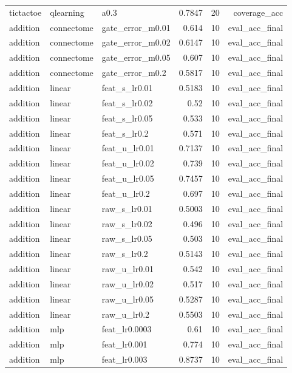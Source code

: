 \begin{table}[t]
\begin{tabular}{lllrrr}
tictactoe & qlearning & a0.3 & 0.7847 & 20 & coverage\_acc \\
addition & connectome & gate\_error\_m0.01 & 0.614 & 10 & eval\_acc\_final \\
addition & connectome & gate\_error\_m0.02 & 0.6147 & 10 & eval\_acc\_final \\
addition & connectome & gate\_error\_m0.05 & 0.607 & 10 & eval\_acc\_final \\
addition & connectome & gate\_error\_m0.2 & 0.5817 & 10 & eval\_acc\_final \\
addition & linear & feat\_s\_lr0.01 & 0.5183 & 10 & eval\_acc\_final \\
addition & linear & feat\_s\_lr0.02 & 0.52 & 10 & eval\_acc\_final \\
addition & linear & feat\_s\_lr0.05 & 0.533 & 10 & eval\_acc\_final \\
addition & linear & feat\_s\_lr0.2 & 0.571 & 10 & eval\_acc\_final \\
addition & linear & feat\_u\_lr0.01 & 0.7137 & 10 & eval\_acc\_final \\
addition & linear & feat\_u\_lr0.02 & 0.739 & 10 & eval\_acc\_final \\
addition & linear & feat\_u\_lr0.05 & 0.7457 & 10 & eval\_acc\_final \\
addition & linear & feat\_u\_lr0.2 & 0.697 & 10 & eval\_acc\_final \\
addition & linear & raw\_s\_lr0.01 & 0.5003 & 10 & eval\_acc\_final \\
addition & linear & raw\_s\_lr0.02 & 0.496 & 10 & eval\_acc\_final \\
addition & linear & raw\_s\_lr0.05 & 0.503 & 10 & eval\_acc\_final \\
addition & linear & raw\_s\_lr0.2 & 0.5143 & 10 & eval\_acc\_final \\
addition & linear & raw\_u\_lr0.01 & 0.542 & 10 & eval\_acc\_final \\
addition & linear & raw\_u\_lr0.02 & 0.517 & 10 & eval\_acc\_final \\
addition & linear & raw\_u\_lr0.05 & 0.5287 & 10 & eval\_acc\_final \\
addition & linear & raw\_u\_lr0.2 & 0.5503 & 10 & eval\_acc\_final \\
addition & mlp & feat\_lr0.0003 & 0.61 & 10 & eval\_acc\_final \\
addition & mlp & feat\_lr0.001 & 0.774 & 10 & eval\_acc\_final \\
addition & mlp & feat\_lr0.003 & 0.8737 & 10 & eval\_acc\_final \\

\end{tabular}
\end{table}
